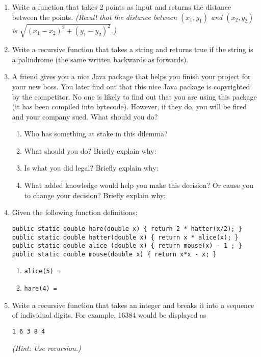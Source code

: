 \begin{enumerate}
    \item Write a function that takes 2 points as input and
	returns the distance between the points.
	{\it (Recall that the distance between $(x_1,y_1)$
	and $(x_2,y_2)$ is $\sqrt{{(x_1-x_2)}^2 + {(y_1 - y_2)}^2}$.)}


    \item Write a recursive function that takes a string and
	returns true if the string is a palindrome (the same
	written backwards as forwards).

    \item A friend gives you a nice Java package that helps
	you finish your project for your new boss.  You
	later find out that this nice Java package is 
	copyrighted by the competitor.  No one is likely
	to find out that you are using this package (it
	has been compiled into bytecode).  However, if they
	do, you will be fired and your company sued.
	What should you do? 

	\begin{enumerate}
	    \item Who has something at stake in this dilemma?
	    \item What should you do?  Briefly explain why:  
	    \item Is what you did legal?  Briefly explain why:  
	    \item What added knowledge would help you make
		this decision?  Or cause you to change your
		decision?  Briefly explain why:
	\end{enumerate}
    \item Given the following function definitions:
\begin{verbatim}
public static double hare(double x) { return 2 * hatter(x/2); }
public static double hatter(double x) { return x * alice(x); }
public static double alice (double x) { return mouse(x) - 1 ; }
public static double mouse(double x) { return x*x - x; }
\end{verbatim}

    \begin{enumerate}
	\item {\tt alice(5) = } \underline{\hspace{2in}}
	\item {\tt hare(4) = } \underline{\hspace{2in}}
    \end{enumerate}
	
    \item Write a recursive function that takes an integer
	and breaks it into a sequence of individual digits.
	For example, 16384 would be displayed as
\begin{verbatim}
1 6 3 8 4
\end{verbatim}
	{\it (Hint: Use recursion.)}

\end{enumerate}



